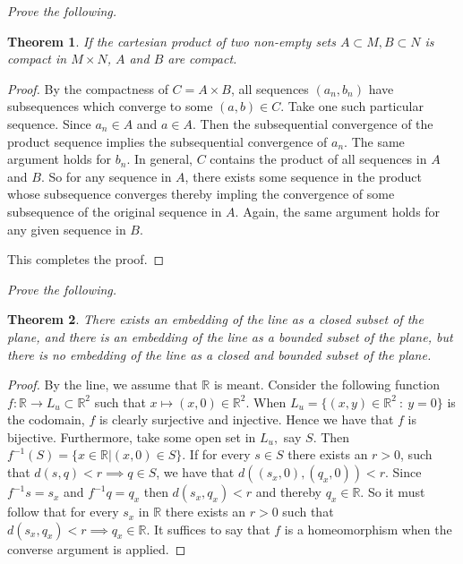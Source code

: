 \documentclass[letter]{article}
\newtheorem{theorem}{Theorem}
\newenvironment{menumerate}{%
  \edef\backupindent{\the\parindent}%
  \enumerate%
  \setlength{\parindent}{\backupindent}%
}{\endenumerate}
\begin{document}
\begin{menumerate}
		\item \emph{Prove the following.}
			\begin{theorem}
				If the cartesian product of two non-empty sets $A \subset M, B \subset N$ is compact in $M\times N$, $A$ and $B$ are compact.
			\end{theorem}
			\begin{proof}
				By the compactness of $C = A \times B$, all sequences $(a_n,b_n)$ have subsequences which converge to some $(a,b) \in C.$ Take one such particular sequence. Since $a_n \in A$ and $a \in A$. Then the  subsequential convergence of the product sequence implies the subsequential convergence of $a_n$. The same argument holds for $b_n.$ In general, $C$ contains the product of all sequences in $A$ and $B$. So for any sequence in $A$, there exists some sequence in the product whose subsequence converges thereby impling the convergence of some subsequence of the original sequence in $A$. Again, the same argument holds for any given sequence in $B$.

				This completes the proof.
			\end{proof}


		\setcounter{enumi}{47}
		\item \emph{Prove the following.}
			\begin{theorem}
				There exists an embedding of the line as a closed subset of the plane, and there is an embedding of the line as a bounded subset of the plane, but there is no embedding of the line as a closed and bounded subset of the plane.
			\end{theorem}
			\begin{proof}
				By the line, we assume that $\mathbb{R}$ is meant. Consider the following function $f: \mathbb{R} \to {L_u} \subset \mathbb{R}^2$ such that $x \mapsto (x,0) \in \mathbb{R}^2.$ When $L_u = \{(x,y) \in \mathbb{R}^2\ : \ y = 0\}$ is the codomain, $f$ is clearly surjective and injective. Hence we have that $f$ is bijective. Furthermore, take some open set in $L_u,$ say $S$. Then $f^{-1}(S) = \{x \in \mathbb{R} | (x,0) \in S \}$. If for every $s \in S$ there exists an $r > 0$, such that $d(s,q) < r \implies q \in S$, we have that $d((s_x,0),(q_x,0)) < r.$ Since $f^{-1}s = s_x$ and $f^{-1}q = q_x$ then $d(s_x, q_x) < r$ and thereby $q_x \in \mathbb{R}.$ So it must follow that for every $s_x$ in $\mathbb{R}$ there exists an $r > 0$ such that $d(s_x, q_x) < r \implies q_x \in \mathbb{R}$. It suffices to say that $f$ is a homeomorphism when the converse argument is applied.


\end{proof}
\end{menumerate}
\end{document}
